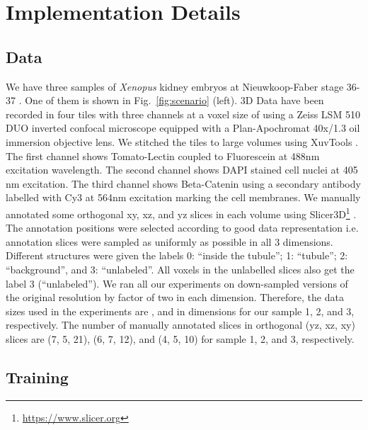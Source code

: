 \documentclass[runningheads,a4paper]{llncs}
\newcommand{\species}[1]{\textit{#1}}
\begin{document}
\section{Implementation Details}

\subsection{Data}

We have three samples of \species{Xenopus} kidney embryos at Nieuwkoop-Faber stage 36-37 \cite{stage}. One of them is shown in Fig.~\ref{fig:scenario} (left). 3D Data have been recorded in four tiles with three channels at a voxel size of  using a Zeiss LSM 510 DUO inverted confocal microscope equipped with a Plan-Apochromat 40x/1.3 oil immersion objective lens. We stitched the tiles to large volumes using XuvTools \cite{xuv}. The first channel shows Tomato-Lectin coupled to Fluorescein at 488nm excitation wavelength. The second channel shows DAPI stained cell nuclei at 405 nm excitation. The third channel shows Beta-Catenin using a secondary antibody labelled with Cy3 at 564nm excitation marking the cell membranes. We manually annotated some orthogonal xy, xz, and yz slices in each volume using Slicer3D\footnote{\url{https://www.slicer.org}} \cite{slicer3d}. The annotation positions were selected according to good data representation i.e. annotation slices were sampled as uniformly as possible in all 3 dimensions. Different structures were given the labels 0: ``inside the tubule''; 1: ``tubule''; 2: ``background'', and 3: ``unlabeled''. All voxels in the unlabelled slices also get the label 3 (``unlabeled''). We ran all our experiments on down-sampled versions of the original resolution by factor of two in each dimension. Therefore, the data sizes used in the experiments are ,  and  in  dimensions for our sample 1, 2, and 3, respectively. The number of manually annotated slices in orthogonal (yz, xz, xy) slices are (7, 5, 21), (6, 7, 12), and (4, 5, 10) for sample 1, 2, and 3, respectively. 

\subsection{Training}
\end{document}
